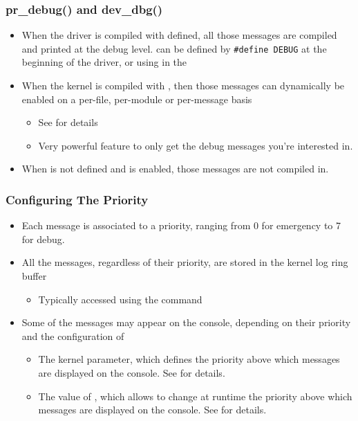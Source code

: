 \begin{frame}
  \frametitle{pr\_debug() and dev\_dbg()}
  \begin{itemize}
  \item When the driver is compiled with  defined, all
    those messages are compiled and printed at the debug level.
     can be defined by {\tt \#define DEBUG} at the
    beginning of the driver, or using
     in the 
  \item When the kernel is compiled with ,
    then those messages can dynamically be enabled on a per-file,
    per-module or per-message basis
    \begin{itemize}
    \item See  for details
    \item Very powerful feature to only get the debug messages you're
      interested in.
    \end{itemize}
  \item When  is not defined and
     is enabled, those messages are not
    compiled in.
  \end{itemize}
\end{frame}

\begin{frame}
  \frametitle{Configuring The Priority}
  \begin{itemize}
  \item Each message is associated to a priority, ranging from 0 for
    emergency to 7 for debug.
  \item All the messages, regardless of their priority, are stored in
    the kernel log ring buffer
    \begin{itemize}
    \item Typically accessed using the  command
    \end{itemize}
  \item Some of the messages may appear on the console, depending on
    their priority and the configuration of
    \begin{itemize}
    \item The  kernel parameter, which defines the
      priority above which messages are displayed on the console. See
       for details.
    \item The value of , which allows to
      change at runtime the priority above which messages are
      displayed on the console. See
       for details.
    \end{itemize}
  \end{itemize}
\end{frame}

